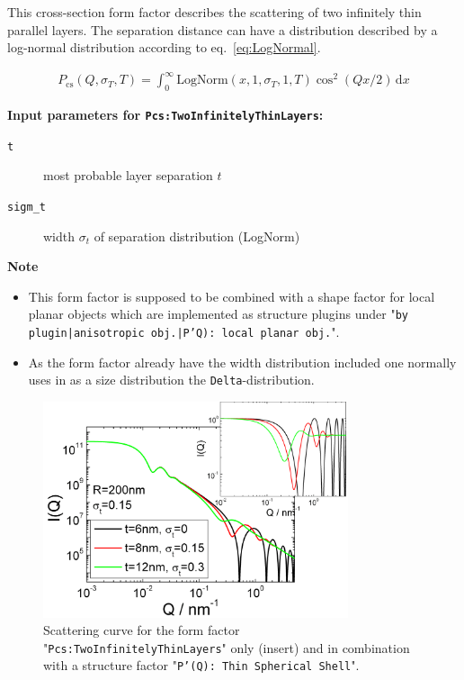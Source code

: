 This cross-section form factor describes the scattering of two infinitely thin parallel layers.
The separation distance can have a distribution described by a log-normal distribution according
to eq.\ \ref{eq:LogNormal}.

\begin{align}
P_\text{cs}(Q,\sigma_{T},T) = \int_0^\infty \textrm{LogNorm}(x,1,\sigma_{T},1,T) \cos^2(Qx/2) \, \textrm{d}x
\end{align}

\noindent
\textbf{Input parameters for \texttt{Pcs:TwoInfinitelyThinLayers}:}
\begin{description}
    \item[\texttt{t}] most probable layer separation $t$
    \item[\texttt{sigm\_t}] width $\sigma_t$ of separation distribution (LogNorm)
\end{description}

\noindent
\textbf{Note}
\begin{itemize}
  \item This form factor is supposed to be combined with a shape factor for
local planar objects which are implemented as structure  plugins
under "\texttt{by plugin|anisotropic obj.|P'Q): local planar
obj.}".
\item As the form factor already have the width distribution included one normally uses in \SASfit as a size distribution
the \texttt{Delta}-distribution.
\end{itemize}

\begin{figure}[htb]
\begin{center}
\includegraphics[width=0.8\textwidth,height=0.55\textwidth]{../images/form_factor/anisotropic/planar2thinIQ.png}
\end{center}
\caption{Scattering curve for the form factor "\texttt{Pcs:TwoInfinitelyThinLayers}" only (insert) and
in combination with a structure factor "\texttt{P'(Q): Thin Spherical Shell}".}
\label{fig_IQ:Pcs:TwoInfinitelyThinLayers}
\end{figure}


